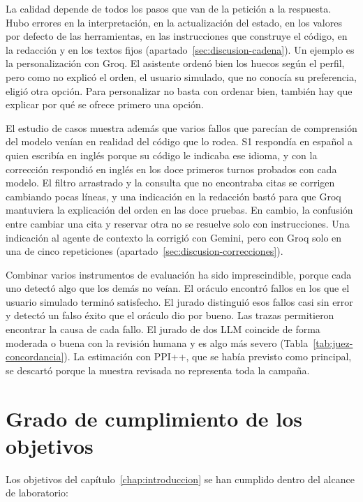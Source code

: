 La calidad depende de todos los pasos que van de la petición a la respuesta.
Hubo errores en la interpretación, en la actualización del estado, en los
valores por defecto de las herramientas, en las instrucciones que construye el
código, en la redacción y en los textos fijos
(apartado~\ref{sec:discusion-cadena}). Un ejemplo es la personalización con
Groq. El asistente ordenó bien los huecos según el perfil, pero como no explicó
el orden, el usuario simulado, que no conocía su preferencia, eligió otra
opción. Para personalizar no basta con ordenar bien, también hay que explicar
por qué se ofrece primero una opción.

El estudio de casos muestra además que varios fallos que parecían de
comprensión del modelo venían en realidad del código que lo rodea. S1 respondía
en español a quien escribía en inglés porque su código le indicaba ese idioma,
y con la corrección respondió en inglés en los doce primeros turnos probados con
cada modelo. El filtro arrastrado y la consulta que no encontraba citas se
corrigen cambiando pocas líneas, y una indicación en la redacción bastó para
que Groq mantuviera la explicación del orden en las doce pruebas. En cambio, la
confusión entre cambiar una cita y reservar otra no se resuelve solo con
instrucciones. Una indicación al agente de contexto la corrigió con Gemini,
pero con Groq solo en una de cinco repeticiones
(apartado~\ref{sec:discusion-correcciones}).

Combinar varios instrumentos de evaluación ha sido imprescindible, porque cada
uno detectó algo que los demás no veían. El oráculo encontró fallos en los que
el usuario simulado terminó satisfecho. El jurado distinguió esos fallos casi
sin error y detectó un falso éxito que el oráculo dio por bueno. Las trazas
permitieron encontrar la causa de cada fallo. El jurado de dos LLM coincide de
forma moderada o buena con la revisión humana y es algo más severo
(Tabla~\ref{tab:juez-concordancia}). La estimación con PPI++, que se había
previsto como principal, se descartó porque la muestra revisada no representa
toda la campaña.

\section{Grado de cumplimiento de los objetivos}

Los objetivos del capítulo~\ref{chap:introduccion} se han cumplido dentro del
alcance de laboratorio:


